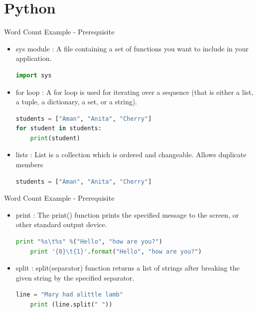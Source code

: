 \documentclass[pdf]{beamer}
\begin{document}
\section{Python}
\begin{frame}[fragile]{Word Count Example - Prerequisite}
	\begin{itemize}
	\item sys module
	: A file containing a set of functions you want to include in your application.
\begin{lstlisting}[language=python]
import sys
\end{lstlisting}		
	\item for loop
	: A for loop is used for iterating over a sequence (that is either a list, a tuple, a dictionary, a set, or a string).
\begin{lstlisting}[language=python]
students = ["Aman", "Anita", "Cherry"] 
for student in students: 
	print(student)
\end{lstlisting}
	\item  lists : List is a collection which is ordered and changeable. Allows duplicate members
\begin{lstlisting}[language=python]
students = ["Aman", "Anita", "Cherry"] 	
\end{lstlisting}	
	\end{itemize}
\end{frame}

\begin{frame}[fragile]{Word Count Example - Prerequisite}
\begin{itemize}
	\item print : The print() function prints the specified message to the screen, or other standard output device.
\begin{lstlisting}[language=python]
	print "%s\t%s" %("Hello", "how are you?")
	print '{0}\t{1}'.format("Hello", "how are you?")
\end{lstlisting}

	\item split : split(separator) function returns a list of strings after breaking the given string by the specified separator.

\begin{lstlisting}[language=python]
	line = "Mary had alittle lamb"
	print (line.split(" "))
\end{lstlisting}

\end{itemize}		
\end{frame}
\end{document}
